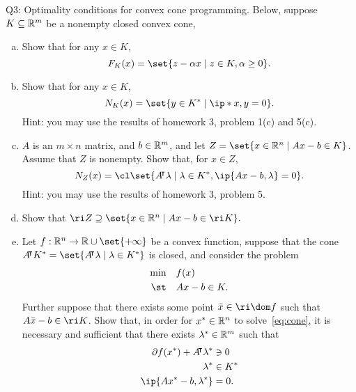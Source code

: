 \documentclass{article}
\begin{document}
\begin{problem}
    {Q3: Optimality conditions for convex cone programming.}
    Below, suppose $K\subseteq\mathbb{R}^m$ be a nonempty closed convex cone,
    \begin{enumerate}[(a)]
        \item Show that for any $x\in K$, \[F_K(x)=\set{z-\alpha x\mid z\in K, \alpha\geq 0}.\]
        \item Show that for any $x\in K$, \[N_K(x)=\set{y\in K^*\mid \ip*{x,y}=0}.\]
        Hint: you may use the results of homework 3, problem 1(c) and 5(c).
        \item  $A$ is an $m\times n$ matrix, and $b\in\mathbb{R}^m$, and let $Z=\set{x\in\R^n\mid Ax-b\in K}$. Assume that $Z$ is nonempty. Show that, for $x\in Z$, \[N_Z(x)=\cl\set{A\trn\lambda\mid\lambda\in K^*,\ip{Ax-b,\lambda}=0}.\]
        Hint: you may use the results of homework 3, problem 5.
        \item Show that $\ri Z \supseteq\set{x\in\R^n\mid Ax-b\in\ri K}.$
        \item Let $f:\R^n\rightarrow\R\cup\set{+\infty}$ be a convex function, suppose that the cone $A\trn K^*=\set{A\trn\lambda\mid\lambda\in K^*}$ is closed, and consider the problem{
            \begin{equation}
                \begin{aligned}
                    \min & \quad f(x) \\
                    \st & \quad Ax-b\in K.
                \end{aligned}
                \label{eq:cone}
            \end{equation}
        }
        Further suppose that there exists some point $\bar{x}\in\ri\dom f$ such that $A\bar{x}-b\in\ri K$. Show that, in order for $x^*\in\mathbb{R}^n$ to solve~\cref{eq:cone}, it is necessary and sufficient that there exists $\lambda^*\in \mathbb{R}^m$ such that
        \begin{align*}
            \partial f(x^*)+A\trn\lambda^* &\ni 0 \\
            \lambda^* & \in K^* \\
            \ip{Ax^*-b,\lambda^*} & =0.
        \end{align*}
    \end{enumerate}
\end{problem}
\end{document}
